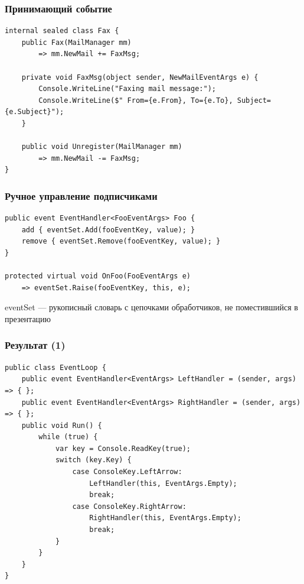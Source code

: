 \documentclass{../../slides-style}
\begin{document}
    \begin{frame}[fragile]
        \frametitle{Принимающий событие}
        \begin{verbatim}
internal sealed class Fax {
    public Fax(MailManager mm)
        => mm.NewMail += FaxMsg;

    private void FaxMsg(object sender, NewMailEventArgs e) {
        Console.WriteLine("Faxing mail message:");
        Console.WriteLine($" From={e.From}, To={e.To}, Subject={e.Subject}");
    }

    public void Unregister(MailManager mm)
        => mm.NewMail -= FaxMsg;
}
        \end{verbatim}
    \end{frame}

    \begin{frame}[fragile]
        \frametitle{Ручное управление подписчиками}
        \begin{verbatim}
public event EventHandler<FooEventArgs> Foo {
    add { eventSet.Add(fooEventKey, value); }
    remove { eventSet.Remove(fooEventKey, value); }
}

protected virtual void OnFoo(FooEventArgs e)
    => eventSet.Raise(fooEventKey, this, e);
        \end{verbatim}
        \vspace{7mm}
        eventSet --- рукописный словарь с цепочками обработчиков, не поместившийся в презентацию
    \end{frame}

    \begin{frame}[fragile]
        \frametitle{Результат (1)}
        \begin{footnotesize}
            \begin{verbatim}
public class EventLoop {
    public event EventHandler<EventArgs> LeftHandler = (sender, args) => { };
    public event EventHandler<EventArgs> RightHandler = (sender, args) => { };
    public void Run() {
        while (true) {
            var key = Console.ReadKey(true);
            switch (key.Key) {
                case ConsoleKey.LeftArrow:
                    LeftHandler(this, EventArgs.Empty);
                    break;
                case ConsoleKey.RightArrow:
                    RightHandler(this, EventArgs.Empty);
                    break;
            }
        }
    }
}
            \end{verbatim}
        \end{footnotesize}
    \end{frame}
\end{document}
